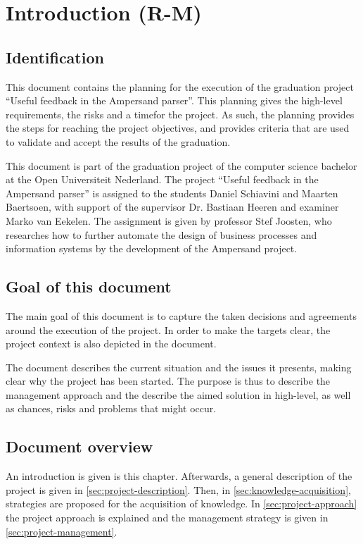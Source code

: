 \section{Introduction (R-M)}
\subsection{Identification}
This document contains the planning for the execution of the graduation project ``Useful feedback in the Ampersand parser''.
This planning gives the high-level requirements, the risks and a timefor the project.
As such, the planning provides the steps for reaching the project objectives, and provides criteria that are used to validate and accept the results of the graduation.

This document is part of the graduation project of the computer science bachelor at the Open Universiteit Nederland.
The project ``Useful feedback in the Ampersand parser'' is assigned to the students Daniel Schiavini and Maarten Baertsoen, with support of the supervisor Dr. Bastiaan Heeren and examiner Marko van Eekelen.
The assignment is given by professor Stef Joosten, who researches how to further automate the design of business processes and information systems by the development of the Ampersand project.

\subsection{Goal of this document}
The main goal of this document is to capture the taken decisions and agreements around the execution of the project.
In order to make the targets clear, the project context is also depicted in the document.

The document describes the current situation and the issues it presents, making clear why the project has been started.
The purpose is thus to describe the management approach and the describe the aimed solution in high-level, as well as chances, risks and problems that might occur.

\subsection{Document overview}
An introduction is given is this chapter.
Afterwards, a general description of the project is given in \autoref{sec:project-description}.
Then, in \autoref{sec:knowledge-acquisition}, strategies are proposed for the acquisition of knowledge.
In \autoref{sec:project-approach} the project approach is explained and the management strategy is given in \autoref{sec:project-management}.

